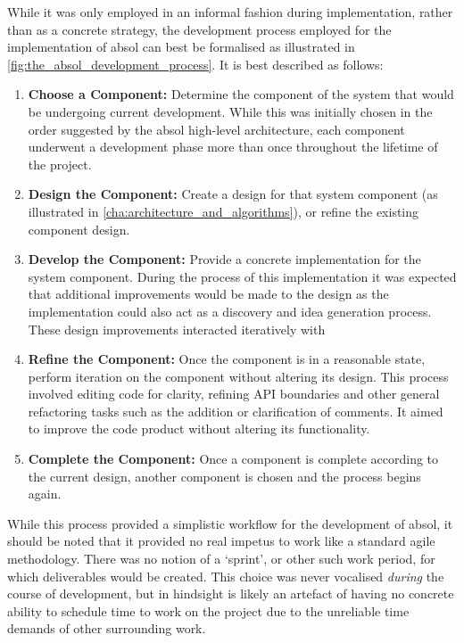 While it was only employed in an informal fashion during implementation, rather than as a concrete strategy, the development process employed for the implementation of \gls{absol} can best be formalised as illustrated in \autoref{fig:the_absol_development_process}.
It is best described as follows:
\begin{enumerate}
    \item \textbf{Choose a Component:} Determine the component of the system that would be undergoing current development. 
    While this was initially chosen in the order suggested by the \gls{absol} high-level architecture, each component underwent a development phase more than once throughout the lifetime of the project.
    \item \textbf{Design the Component:} Create a design for that system component (as illustrated in \autoref{cha:architecture_and_algorithms}), or refine the existing component design.
    \item \textbf{Develop the Component:} Provide a concrete implementation for the system component.
    During the process of this implementation it was expected that additional improvements would be made to the design as the implementation could also act as a discovery and idea generation process.
    These design improvements interacted iteratively with 
    \item \textbf{Refine the Component:} Once the component is in a reasonable state, perform iteration on the component without altering its design.
    This process involved editing code for clarity, refining API boundaries and other general refactoring tasks such as the addition or clarification of comments. 
    It aimed to improve the code product without altering its functionality.
    \item \textbf{Complete the Component:} Once a component is complete according to the current design, another component is chosen and the process begins again.
\end{enumerate}

While this process provided a simplistic workflow for the development of \gls{absol}, it should be noted that it provided no real impetus to work like a standard agile methodology.
There was no notion of a `sprint', or other such work period, for which deliverables would be created.
This choice was never vocalised \textit{during} the course of development, but in hindsight is likely an artefact of having no concrete ability to schedule time to work on the project due to the unreliable time demands of other surrounding work. 

